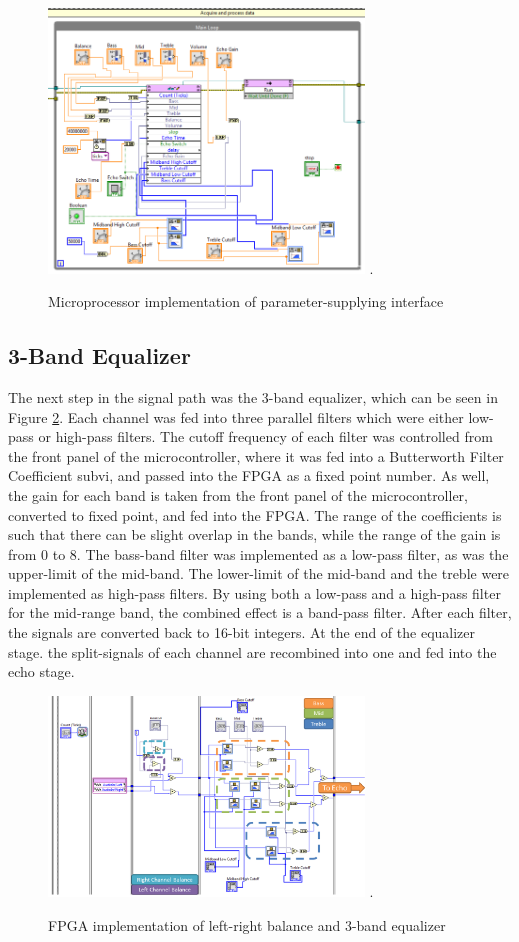 \begin{figure}[!t]
\centering
\includegraphics[width=3.3in]{microcontroller.png}
\DeclareGraphicsExtensions.
\caption{Microprocessor implementation of parameter-supplying interface}
\label{fig_AEPUMicro}
\end{figure}

\subsection{3-Band Equalizer}
The next step in the signal path was the 3-band equalizer, which can be seen in Figure \ref{fig_BEQ}. 
Each channel was fed into three parallel filters which were either low-pass or high-pass filters.
The cutoff frequency of each filter was controlled from the front panel of the microcontroller, where it was fed into a Butterworth Filter Coefficient subvi, and passed into the FPGA as a fixed point number.
As well, the gain for each band is taken from the front panel of the microcontroller, converted to fixed point, and fed into the FPGA.
The range of the coefficients is such that there can be slight overlap in the bands, while the range of the gain is from 0 to 8.
The bass-band filter was implemented as a low-pass filter, as was the upper-limit of the mid-band.
The lower-limit of the mid-band and the treble were implemented as high-pass filters.
By using both a low-pass and a high-pass filter for the mid-range band, the combined effect is a band-pass filter.
After each filter, the signals are converted back to 16-bit integers.
At the end of the equalizer stage. the split-signals of each channel are recombined into one and fed into the echo stage.

\begin{figure}[!t]
\centering
\includegraphics[width=3.3in]{balanceandeq.png}
\DeclareGraphicsExtensions.
\caption{FPGA implementation of left-right balance and 3-band equalizer}
\label{fig_BEQ}
\end{figure}  

